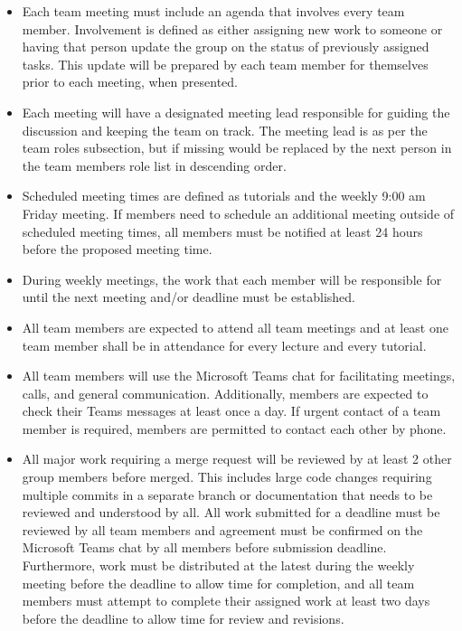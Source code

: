 \documentclass{article}
\begin{document}
\begin{itemize}
	\item Each team meeting must include an agenda that involves every team member. Involvement is defined as either assigning new work to someone or having that person update the group on the status of previously assigned tasks. This update will be prepared by each team member for themselves prior to each meeting, when presented.
	\item Each meeting will have a designated meeting lead responsible for guiding the discussion and keeping the team on track. The meeting lead is as per the team roles subsection, but if missing would be replaced by the next person in the team members role list in descending order.
	\item Scheduled meeting times are defined as tutorials and the weekly 9:00 am Friday meeting. If members need to schedule an additional meeting outside of scheduled meeting times, all members must be notified at least 24 hours before the proposed meeting time.
	\item During weekly meetings, the work that each member will be responsible for until the next meeting and/or deadline must be established.
	\item All team members are expected to attend all team meetings and at least one team member shall be in attendance for every lecture and every tutorial.
	\item All team members will use the Microsoft Teams chat for facilitating meetings, calls, and general communication. Additionally, members are expected to check their Teams messages at least once a day. If urgent contact of a team member is required, members are permitted to contact each other by phone.
	\item All major work requiring a merge request will be reviewed by at least 2 other group members before merged. This includes large code changes requiring multiple commits in a separate branch or documentation that needs to be reviewed and understood by all. All work submitted for a deadline must be reviewed by all team members and agreement must be confirmed on the Microsoft Teams chat by all members before submission deadline. Furthermore, work must be distributed at the latest during the weekly meeting before the deadline to allow time for completion, and all team members must attempt to complete their assigned work at least two days before the deadline to allow time for review and revisions.
\end{itemize}
\end{document}
